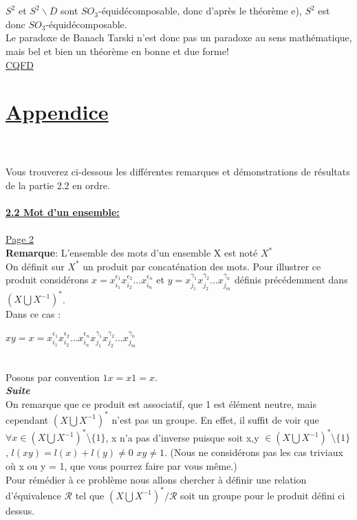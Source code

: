 \documentclass{article}
\begin{document}
\\~\\
$S^2$ et $S^2\backslash \overline{D}$ sont $SO_3$-équidécomposable, donc d'après le théorème e), $S^2$ est donc $SO_3$-équidécomposable.\\

Le paradoxe de Banach Tarski n'est donc pas un paradoxe au sens mathématique, mais bel et bien un théorème en bonne et due forme!\\


{\Large \underline{CQFD}}

\pagebreak
\section{\underline{Appendice}}\\~\\

Vous trouverez ci-dessous les différentes remarques et démonstrations de résultats de la partie 2.2 en ordre.\\~\\

\textbf{\underline{2.2 Mot d'un ensemble:}}\\~\\

\underline{Page 2}\\

\textbf{Remarque}: L'ensemble des mots d'un ensemble X est noté $X^{*}$
\\ On définit sur $X^{*}$ un produit par concaténation des mots. Pour illustrer ce produit considérons $x = x^{\epsilon_1}_{i_1} x^{\epsilon_2}_{i_2} \dots x^{\epsilon_n}_{i_n}$ et $y = x^{\gamma_1}_{j_1} x^{\gamma_2}_{j_2} \dots x^{\gamma_n}_{j_m}$ définis précédemment dans $(X\bigcup X^{-1})^{*}$.\\
Dans ce cas : 
\begin{center}$xy=x = x^{\epsilon_1}_{i_1} x^{\epsilon_2}_{i_2} \dots x^{\epsilon_n}_{i_n}x^{\gamma_1}_{j_1} x^{\gamma_2}_{j_2} \dots x^{\gamma_n}_{j_m}$ \end{center}\\
Posons par convention $1x=x1=x$.\\

\textbf{\textit{Suite}}\\
On remarque que ce produit est associatif, que 1 est élément neutre, mais cependant $(X \bigcup X^{-1})^{*}$ n'est pas un groupe. En effet, il suffit de voir que $\forall x \in (X\bigcup X^{-1})^{*}\setminus\{1\}$, x n'a pas d'inverse puisque soit x,y $\in (X\bigcup X^{-1})^{*}\setminus\{1\}$, $l(xy)=l(x)+l(y)\neq0$ \Rightarrow \hspace{0.05cm} $xy \neq 1$. (Nous ne considérons pas les cas triviaux où x ou y = 1, que vous pourrez faire par vous même.) \\
Pour rémédier à ce problème nous allons chercher à définir une relation d'équivalence $\mathcal{R}$ tel que $(X\bigcup X^{-1})^{*}/\mathcal{R}$ soit un groupe pour le produit défini ci dessus.\\~\\
\end{document}
